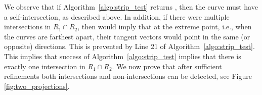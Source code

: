 

We observe that if Algorithm~\ref{algo:strip_test} returns \true, then the curve must have a self-intersection, as described above.  In addition, if there were multiple intersections in $R_1\cap R_2$, then \cite[Lemma 3.1]{Byrd:2023} would imply that at the extreme point, i.e., when the curves are farthest apart, their tangent vectors would point in the same (or opposite) directions.  This is prevented by Line 21 of Algorithm~\ref{algo:strip_test}.  This implies that success of Algorithm~\ref{algo:strip_test} implies that there is exactly one intersection in $R_1\cap R_2$.  We now prove that after sufficient refinements both intersections and non-intersections can be detected, see Figure \ref{fig:two_projections}.

